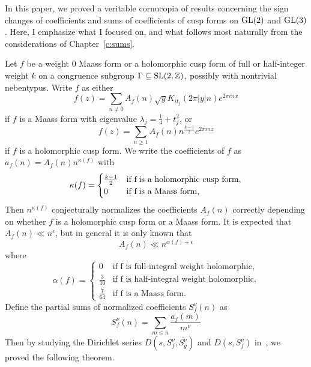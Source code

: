 In this paper, we proved a veritable cornucopia of results concerning the sign changes of
coefficients and sums of coefficients of cusp forms on $\operatorname{GL}(2)$ and $\operatorname{GL}(3)$.
Here, I emphasize what I focused on, and what follows most naturally from the
considerations of Chapter~\ref{c:sums}.

Let $f$ be a weight $0$ Maass form or a holomorphic cusp form of full or half-integer
weight $k$ on a congruence subgroup $\Gamma \subseteq \operatorname{SL}(2, \mathbb{Z})$, possibly with
nontrivial nebentypus.
Write $f$ as either
\begin{equation}
  f(z) = \sum_{n \neq 0} A_f(n) \sqrt{y} K_{it_j} (2\pi \lvert y \rvert n) e^{2\pi i n x}
\end{equation}
if $f$ is a Maass form with eigenvalue $\lambda_j = \frac{1}{4} + t_j^2$, or
\begin{equation}
  f(z) = \sum_{n \geq 1} A_f(n)n^{\frac{k-1}{2}} e^{2 \pi i n z}
\end{equation}
if $f$ is a holomorphic cusp form.
We write the coefficients of $f$ as $a_f(n) = A_f(n)n^{\kappa(f)}$ with
\begin{equation}
  \kappa(f) = \begin{cases}
    \frac{k-1}{2} & \text{if } $f$ \; \text{is a holomorphic cusp form}, \\
    0 & \text{if } $f$ \; \text{is a Maass form},
  \end{cases}
\end{equation}
Then $n^{\kappa(f)}$ conjecturally normalizes the coefficients $A_f(n)$ correctly
depending on whether $f$ is a holomorphic cusp form or a Maass form.
It is expected that $A_f(n) \ll n^\epsilon$, but in general it is only known that
\begin{equation}
  A_f(n) \ll n^{\alpha(f) + \epsilon}
\end{equation}
where
\begin{equation}
  \alpha(f) = \begin{cases}
    0 & \text{if f is full-integral weight holomorphic}, \\
    \frac{3}{16} & \text{if f is half-integral weight holomorphic}, \\
    \frac{7}{64} & \text{if f is a Maass form}.
  \end{cases}
\end{equation}
Define the partial sums of normalized coefficients $S_f^\nu(n)$ as
\begin{equation}
  S_f^\nu(n) = \sum_{m \leq n} \frac{a_f(m)}{m^\nu}
\end{equation}
Then by studying the Dirichlet series $D(s, S_f^\nu, \overline{S_g^\nu})$ and $D(s,
S_f^\nu)$ in~\cite{hkldwSigns}, we proved the following theorem.


